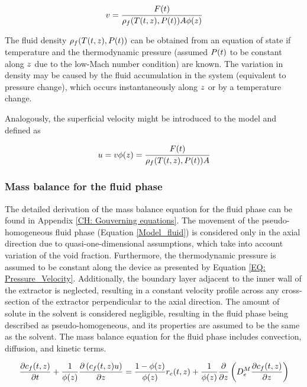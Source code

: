 \documentclass[../Article_Model_Parameters.tex]{subfiles}
\begin{document}
	{\footnotesize
	\begin{equation}
		v = \cfrac{{\color{black}F}(t)}{{\color{black}\rho_f}({\color{black}T}(t,z),{\color{black}P}(t)) {\color{black}A\phi}(z)} 
	\end{equation}
	}
	
	The fluid density ${\color{black}\rho_f}({\color{black}T}(t,z),{\color{black}P}(t))$ can be obtained from an equation of state if temperature and the thermodynamic pressure (assumed ${\color{black}P}(t)$ to be constant along ${\color{black}z}$ due to the low-Mach number condition) are known. The variation in density may be caused by the fluid accumulation in the system (equivalent to pressure change), which occurs instantaneously along ${\color{black}z}$ or by a temperature change. 
	
	Analogously, the superficial velocity might be introduced to the model and defined as
	
	{\footnotesize
		\begin{equation}
			u = v {\color{black}\phi}(z) = \cfrac{{\color{black}F}(t)}{{\color{black}\rho_f}({\color{black}T}(t,z),{\color{black}P}(t)) {\color{black} A} }
		\end{equation}
	}
	
	\subsubsection{Mass balance for the fluid phase} \label{CH: Mass_balance_fluid}
	
	The detailed derivation of the mass balance equation for the fluid phase can be found in Appendix \ref{CH: Gouverning equations}. The movement of the pseudo-homogeneous fluid phase (Equation \ref{Model_fluid}) is considered only in the axial direction due to quasi-one-dimensional assumptions, which take into account variation of the void fraction. Furthermore, the thermodynamic pressure is assumed to be constant along the device as presented by Equation \ref{EQ: Pressure_Velocity}. Additionally, the boundary layer adjacent to the inner wall of the extractor is neglected, resulting in a constant velocity profile across any cross-section of the extractor perpendicular to the axial direction. The amount of solute in the solvent is considered negligible, resulting in the fluid phase being described as pseudo-homogeneous, and its properties are assumed to be the same as the solvent. The mass balance equation for the fluid phase includes convection, diffusion, and kinetic terms.
	
	{\footnotesize
		\begin{equation}
			\label{Model_fluid}
			\frac{\partial {\color{black}c_f}(t,z)}{\partial t}
			+ \frac{1}{{\color{black}\phi}(z)} \frac{\partial \left( {\color{black}c_f}(t,z) u\right)}{\partial {\color{black}z}}
			= \frac{1-{\color{black}\phi}(z)}{{\color{black}\phi}(z)} {\color{black}r_e}(t,z)
			+ \frac{1}{{\color{black}\phi}(z)} \frac{\partial}{\partial {\color{black}z}} \left( {\color{black}D^M_e} \frac{\partial {\color{black}c_f}(t,z)}{\partial {\color{black}z}} \right)
		\end{equation}
	}
	
\end{document}
